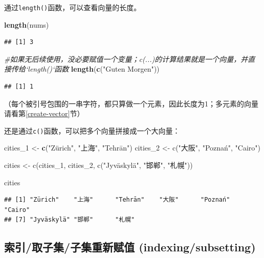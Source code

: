 \documentclass[]{book}
\newenvironment{Shaded}{\begin{snugshade}}{\end{snugshade}}
\newcommand{\CommentTok}[1]{\textcolor[rgb]{0.56,0.35,0.01}{\textit{#1}}}
\newcommand{\DecValTok}[1]{\textcolor[rgb]{0.00,0.00,0.81}{#1}}
\newcommand{\KeywordTok}[1]{\textcolor[rgb]{0.13,0.29,0.53}{\textbf{#1}}}
\newcommand{\NormalTok}[1]{#1}
\newcommand{\StringTok}[1]{\textcolor[rgb]{0.31,0.60,0.02}{#1}}
\begin{document}
通过\texttt{length()}函数，可以查看向量的长度。

\begin{Shaded}
\begin{Highlighting}[]
\KeywordTok{length}\NormalTok{(nums)}
\end{Highlighting}
\end{Shaded}

\begin{verbatim}
## [1] 3
\end{verbatim}

\begin{Shaded}
\begin{Highlighting}[]
\CommentTok{#如果无后续使用，没必要赋值一个变量；c(...)的计算结果就是一个向量，并直接传给`length()`函数}
\KeywordTok{length}\NormalTok{(}\KeywordTok{c}\NormalTok{(}\StringTok{"Guten Morgen"}\NormalTok{)) }
\end{Highlighting}
\end{Shaded}

\begin{verbatim}
## [1] 1
\end{verbatim}

（每个被引号包围的一串字符，都只算做一个元素，因此长度为1；多元素的向量请看第\ref{create-vector}节）

还是通过\texttt{c()}函数，可以把多个向量拼接成一个大向量：

\begin{Shaded}
\begin{Highlighting}[]
\NormalTok{cities_}\DecValTok{1}\NormalTok{ <-}\StringTok{ }\KeywordTok{c}\NormalTok{(}\StringTok{"Zürich", "}\NormalTok{上海}\StringTok{", "}\NormalTok{Tehrān}\StringTok{")}
\StringTok{cities_2 <- c("}\NormalTok{大阪}\StringTok{", "}\NormalTok{Poznań}\StringTok{", "}\NormalTok{Cairo}\StringTok{")}

\StringTok{cities <- c(cities_1, cities_2, c("}\NormalTok{Jyväskylä}\StringTok{", "}\NormalTok{邯郸}\StringTok{", "}\NormalTok{札幌่}\StringTok{"))}

\StringTok{cities}
\end{Highlighting}
\end{Shaded}

\begin{verbatim}
## [1] "Zürich"    "上海"      "Tehrān"    "大阪"      "Poznań"    "Cairo"    
## [7] "Jyväskylä" "邯郸"      "札幌่"
\end{verbatim}

\hypertarget{indexing}{%
\subsection{索引/取子集/子集重新赋值 (indexing/subsetting)}\label{indexing}}
\end{document}

